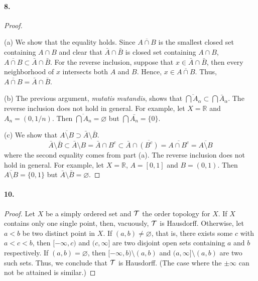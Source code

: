   \paragraph{8.}
  \begin{proof}
    $\,$\par
    (a) We show that the equality holds. Since $\overline{A\cap B}$ is the
    smallest closed set containing $A\cap B$ and clear that $\bar{A}\cap
    \bar{B}$ is closed set containing $A\cap B$, $\overline{A\cap B}\subset
    \bar{A}\cap\bar{B}$. For the reverse inclusion, suppose that $x\in\bar{A}
    \cap\bar{B}$, then every neighborhood of $x$ intersects both $A$ and $B$.
    Hence, $x\in\overline{A\cap B}$. Thus, $\overline{A\cap B}=\bar{A}\cap
    \bar{B}$.\par
    (b) The previous argument, \textit{mutatis mutandis}, shows that 
    $\overline{\bigcap A_\alpha}\subset\bigcap\bar{A}_\alpha$. The reverse
    inclusion does not hold in general. For example, let $X=\mathbb{R}$ and
    $A_n=(0,1/n)$. Then $\overline{\bigcap A_n}=\varnothing$ but $\bigcap\bar{
    A_n}=\{0\}$.\par
    (c) We show that $\overline{A\setminus B}\supset\bar{A}\setminus\bar{B}$.
    \[
      \bar{A}\setminus\bar{B}\subset
      \bar{A}\setminus B=
      \bar{A}\cap B^c\subset
      \bar{A}\cap\overline{(B^c)}=
      \overline{A\cap B^c}=
      \overline{A\setminus B}
    \]
    where the second equality comes from part (a). The reverse inclusion does
    not hold in general. For example, let $X=\mathbb{R}$, $A=[0,1]$ and $B=(0,
    1)$. Then $\overline{A\setminus B}=\{0,1\}$ but $\bar{A}\setminus\bar{B}=
    \varnothing$.
  \end{proof}
  
  \paragraph{10.}
  \begin{proof}
    Let $X$ be a simply ordered set and $\mathcal{T}$ the order topology for $X$.
    If $X$ contains only one single point, then, vacuously, $\mathcal{T}$ is 
    Hausdorff. Otherwise, let $a<b$ be two distinct point in $X$. If $(a,b)\ne
    \varnothing$, that is, there exists some $c$ with $a<c<b$, then $[-\infty,
    c)$ and $(c,\infty]$ are two disjoint open sets containing $a$ and $b$
    respectively.  If $(a,b)=\varnothing$, then $[-\infty,b)\setminus(a,b)$ and 
    $(a,\infty]\setminus(a,b)$ are two such sets. Thus, we conclude that 
    $\mathcal{T}$ is Hausdorff. (The case where the $\pm\infty$ can not be 
    attained is similar.)
  \end{proof}
  
